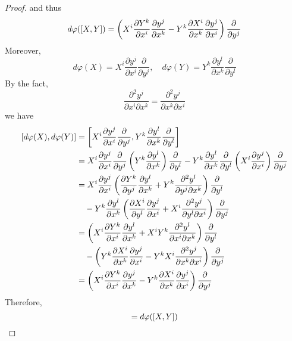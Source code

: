 \begin{enumerate}[label=\Roman{*}.]
\begin{proof}
		and thus
		\begin{equation*}
			d\varphi([X,Y]) = \left(X^i\frac{\partial Y^k}{\partial x^i}\frac{\partial y^j}{\partial x^k} - Y^k\frac{\partial X^i}{\partial x^k}\frac{\partial y^j}{\partial x^i}\right)\frac{\partial}{\partial y^j}
		\end{equation*}
		Moreover,
		\begin{equation*}
			d\varphi(X) = X^i\frac{\partial y^j}{\partial x^i}\frac{\partial}{\partial y^j},\quad d\varphi(Y) = Y^k\frac{\partial y^l}{\partial x^k}\frac{\partial}{\partial y^l}
		\end{equation*}
		By the fact,
		\begin{equation*}
			\frac{\partial^2 y^j}{\partial x^i\partial x^k} =\frac{\partial^2 y^j}{\partial x^k\partial x^i}
		\end{equation*}
		we have
		\begin{equation*}
			\begin{aligned}
				[d\varphi(X),d\varphi(Y)] &= \bj{X^i\frac{\partial y^j}{\partial x^i}\frac{\partial}{\partial y^j}, Y^k\frac{\partial y^l}{\partial x^k}\frac{\partial}{\partial y^l}} \\
				&= X^i\frac{\partial y^j}{\partial x^i}\frac{\partial}{\partial y^j}\bc{Y^k\frac{\partial y^l}{\partial x^k}}\frac{\partial}{\partial y^l} - Y^k\frac{\partial y^l}{\partial x^k}\frac{\partial}{\partial y^l}\bc{X^i\frac{\partial y^j}{\partial x^i}}\frac{\partial}{\partial y^j} \\
				&= X^i\frac{\partial y^j}{\partial x^i}\bc{\frac{\partial Y^k}{\partial y^j}\frac{\partial y^l}{\partial x^k} + Y^k\frac{\partial^2 y^l}{\partial y^j\partial x^k}}\frac{\partial}{\partial y^l} \\
				&\quad - Y^k\frac{\partial y^l}{\partial x^k}\bc{\frac{\partial X^i}{\partial y^l}\frac{\partial y^j}{\partial x^i} +X^i\frac{\partial^2 y^j}{\partial y^l\partial x^i}}\frac{\partial}{\partial y^j} \\
				&= \bc{X^i\frac{\partial Y^k}{\partial x^i}\frac{\partial y^l}{\partial x^k}+X^iY^k\frac{\partial^2 y^l}{\partial x^i\partial x^k}}\frac{\partial}{\partial y^l} \\
				& \quad - \bc{Y^k\frac{\partial X^i}{\partial x^k}\frac{\partial y^j}{\partial x^i} - Y^kX^i\frac{\partial^2 y^j}{\partial x^k\partial x^i}}\frac{\partial}{\partial y^j} \\
				&= \bc{X^i\frac{\partial Y^k}{\partial x^i}\frac{\partial y^j}{\partial x^k} - Y^k\frac{\partial X^i}{\partial x^k}\frac{\partial y^j}{\partial x^i}}\frac{\partial}{\partial y^j}
			\end{aligned}
		\end{equation*}
		Therefore,
		\begin{equation*}
			[d\varphi(X),d\varphi(Y)] = d\varphi([X,Y])\qedhere
		\end{equation*}
	\end{proof}
\end{enumerate}

